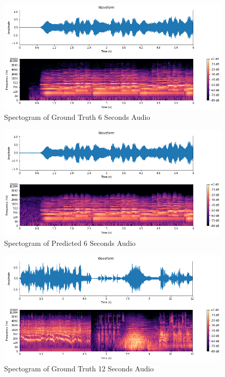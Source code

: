 \documentclass{ioereport}
\begin{document}
    \begin{figure}[H]
        \centering
        \includegraphics[width=\linewidth]{assets/audio_results/06seconds.png}
        \caption{Spectogram of Ground Truth 6 Seconds Audio}
        \label{fig:gt-6s-spec}
    \end{figure}
    
    \begin{figure}[H]
        \centering
        \includegraphics[width=\linewidth]{assets/audio_results/06secondspred.png}
        \caption{Spectogram of Predicted 6 Seconds Audio}
        \label{fig:pred-6s-spec}
    \end{figure}

    \begin{figure}[H]
        \centering
        \includegraphics[width=\linewidth]{assets/audio_results/12seconds.png}
        \caption{Spectogram of Ground Truth 12 Seconds Audio}
        \label{fig:gt-12s-spec}
    \end{figure}
    
\end{document}
